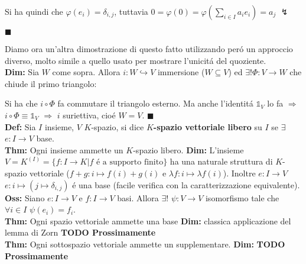 \documentclass[a4paper,11pt]{article}
\newcommand{\todo}{{\bf TODO Prossimamente}}
\newcommand{\function}[3]{#1:#2 \rightarrow #3}
\newcommand{\injfunction}[3]{#1:#2 \hookrightarrow #3}
\newcommand{\thm}{\vskip 0.05cm \noindent \textbf{Thm:} }
\newcommand{\proof}{\vskip 0.05cm \noindent \textbf{Dim:} }
\newcommand{\definition}{\vskip 0.05cm \noindent \textbf{Def:} }
\newcommand{\oss}{\vskip 0.05cm \noindent \textbf{Oss:} }
\newcommand{\proofend}{\begin{flushright} $\blacksquare$ \end{flushright}}
\begin{document}
\begin{center}
\end{center}
Si ha quindi che $\varphi(e_{i})=\delta_{i, j}$, tuttavia $0=\varphi(0)=\varphi(\sum_{i\in I}a_{i}e_{i})=a_{j}$ \hfill $\lightning$
\proofend
\noindent Diamo ora un'altra dimostrazione di questo fatto utilizzando per\'o un approccio diverso, molto simile a quello usato per mostrare l'unicit\'a del quoziente.\\
\proof Sia $W$ come sopra. Allora $\injfunction{i}{W}{V}$ immersione ($W\subseteq V$) ed $\exists !\function{\Phi}{V}{W}$ che chiude il primo triangolo:
\begin{center}
\end{center}
Si ha che $i \circ \Phi$ fa commutare il triangolo esterno. Ma anche l'identit\'a $\mathds{1}_{V}$ lo fa $\Rightarrow$ $i \circ \Phi \equiv \mathds{1}_{V}$ $\Rightarrow$ $i$ suriettiva, cio\'e $W=V$. \hfill $\blacksquare$\\
\definition Sia $I$ insieme, $V$ $K$-spazio, si dice {\bf $K$-spazio vettoriale libero} su $I$ se $\exists$ $\function{e}{I}{V}$ base.\\
\thm Ogni insieme ammette un $K$-spazio libero.
\proof L'insieme $V=K^{(I)}=\{\function{f}{I}{K}| f \mbox{ \'e a supporto finito}\}$ ha una naturale struttura di $K$-spazio vettoriale ($f+g:i\mapsto f(i)+g(i)$ e $\lambda f:i\mapsto \lambda f(i)$). Inoltre $\function{e}{I}{V}$ $e:i\mapsto (j\mapsto \delta_{i,j})$ \'e una base (facile verifica con la caratterizzazione equivalente).\\
\oss Siano $\function{e}{I}{V}$ e $\function{f}{I}{V}$ basi. Allora $\exists !$ $\function{\psi}{V}{V}$ isomorfismo tale che $\forall i\in I$ $\psi(e_{i})=f_{i}$.\\
\thm Ogni spazio vettoriale ammette una base
\proof classica applicazione del lemma di Zorn \todo
\\
\thm Ogni sottospazio vettoriale ammette un supplementare.
\proof \todo
\end{document}
